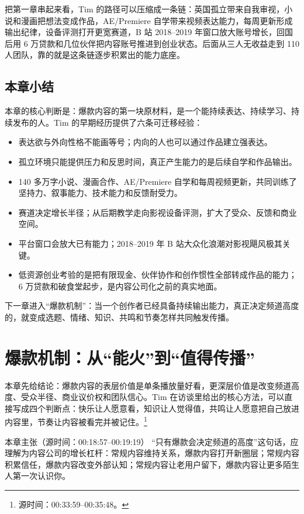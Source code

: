 \documentclass[a4paper]{article}
\begin{document}
把第一章串起来看，Tim 的路径可以压缩成一条链：英国孤立带来自我审视，小说和漫画把想法变成作品，AE/Premiere 自学带来视频表达能力，每周更新形成输出纪律，设备评测打开更宽赛道，B 站 2018--2019 年窗口放大账号增长，回国后用 6 万贷款和几位伙伴把内容账号推进到创业状态。后面从三人无收益走到 110 人团队，靠的就是这条链逐步积累出的能力底座。

\subsection{本章小结}

本章的核心判断是：爆款内容的第一块原材料，是一个能持续表达、持续学习、持续发布的人。Tim 的早期经历提供了六条可迁移经验：

\begin{itemize}
  \item 表达欲与外向性格不能画等号；内向的人也可以通过作品建立强表达。
  \item 孤立环境只能提供压力和反思时间，真正产生能力的是后续自学和作品输出。
  \item 140 多万字小说、漫画合作、AE/Premiere 自学和每周视频更新，共同训练了坚持力、叙事能力、技术能力和反馈耐受力。
  \item 赛道决定增长半径；从后期教学走向影视设备评测，扩大了受众、反馈和商业空间。
  \item 平台窗口会放大已有能力；2018--2019 年 B 站大众化浪潮对影视飓风极其关键。
  \item 低资源创业考验的是把有限现金、伙伴协作和创作惯性全部转成作品的能力；6 万贷款和破食堂起步，是内容公司化之前的真实地面。
\end{itemize}

下一章进入“爆款机制”：当一个创作者已经具备持续输出能力，真正决定频道高度的，就变成选题、情绪、知识、共鸣和节奏怎样共同触发传播。
\section{爆款机制：从“能火”到“值得传播”}

本章先给结论：爆款内容的表层价值是单条播放量好看，更深层价值是改变频道高度、受众半径、商业议价权和团队信心。Tim 在访谈里给出的核心方法，可以直接写成四个判断点：快乐让人愿意看，知识让人觉得值，共鸣让人愿意把自己放进内容里，节奏让内容被看完并被记住。\footnote{源时间：00:33:59--00:35:48。}

\begin{importantbox}{本章主张（源时间：00:18:57--00:19:19）}
“只有爆款会决定频道的高度”这句话，应理解为内容公司的增长杠杆：常规内容维持关系，爆款内容打开新圈层；常规内容积累信任，爆款内容改变外部认知；常规内容让老用户留下，爆款内容让更多陌生人第一次认识你。
\end{importantbox}
\end{document}

